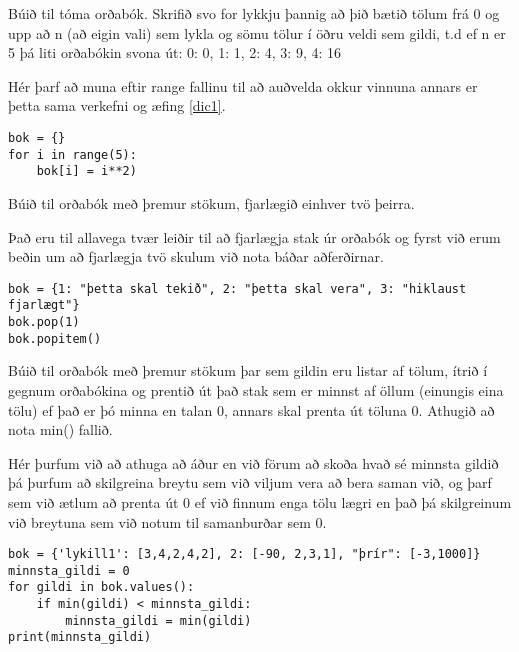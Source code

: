 \begin{exercise}\label{dic2}
Búið til tóma orðabók.
Skrifið svo for lykkju þannig að þið bætið tölum frá 0 og upp að n (að eigin vali) sem lykla og sömu tölur í öðru veldi sem gildi, t.d ef n er 5 þá liti orðabókin svona út:
{0: 0, 1: 1, 2: 4, 3: 9, 4: 16}
\end{exercise}
\begin{Answer}[ref={dic2}]
Hér þarf að muna eftir range fallinu til að auðvelda okkur vinnuna annars er þetta sama verkefni og æfing \ref{dic1}.
\begin{lstlisting}
bok = {}
for i in range(5):
	bok[i] = i**2)\end{lstlisting}
\end{Answer}

\begin{exercise}\label{dic3}
Búið til orðabók með þremur stökum, fjarlægið einhver tvö þeirra.
\end{exercise}
\begin{Answer}[ref={dic3}]
Það eru til allavega tvær leiðir til að fjarlægja stak úr orðabók og fyrst við erum beðin um að fjarlægja tvö skulum við nota báðar aðferðirnar.
	\begin{lstlisting}
bok = {1: "þetta skal tekið", 2: "þetta skal vera", 3: "hiklaust fjarlægt"}
bok.pop(1)
bok.popitem()\end{lstlisting}
\end{Answer}

\begin{exercise}\label{dic4}
	Búið til orðabók með þremur stökum þar sem gildin eru listar af tölum, ítrið í gegnum orðabókina og prentið út það stak sem er minnst af öllum (einungis eina tölu) ef það er þó minna en talan 0, annars skal prenta út töluna 0.
	Athugið að nota min() fallið.
\end{exercise}
\begin{Answer}[ref={dic4}]
Hér þurfum við að athuga að áður en við förum að skoða hvað sé minnsta gildið þá þurfum að skilgreina breytu sem við viljum vera að bera saman við, og þarf sem við ætlum að prenta út 0 ef við finnum enga tölu lægri en það þá skilgreinum við breytuna sem við notum til samanburðar sem 0.
	\begin{lstlisting}
bok = {'lykill1': [3,4,2,4,2], 2: [-90, 2,3,1], "þrír": [-3,1000]}
minnsta_gildi = 0
for gildi in bok.values():
	if min(gildi) < minnsta_gildi:
		minnsta_gildi = min(gildi)
print(minnsta_gildi)\end{lstlisting}
\end{Answer}


